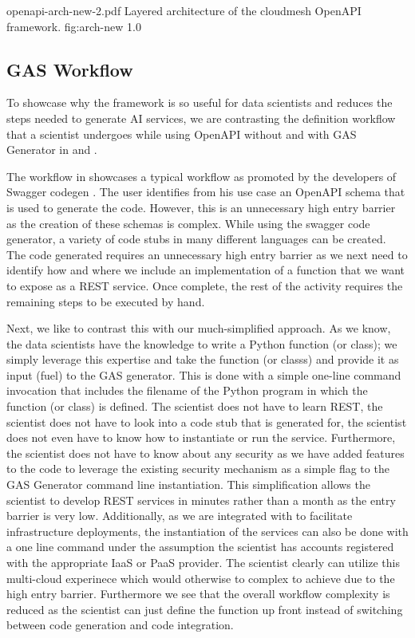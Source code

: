 
\OneFIGURE
    {openapi-arch-new-2.pdf}
    {Layered architecture of the cloudmesh OpenAPI framework.}
    {fig:arch-new}
    {1.0}

\subsection{GAS Workflow}

To showcase why the framework is so useful for data scientists and reduces
the steps needed to generate AI services, we are
contrasting the definition workflow that a scientist undergoes while
using OpenAPI without and with GAS Generator
in  and .

The workflow in  showcases a typical workflow
as promoted by the developers of Swagger
codegen \cite{www-swagger-codegen}. The user identifies from his use
case an OpenAPI schema that is used to generate the code. However,
this is an unnecessary high entry barrier as the creation of these
schemas is complex. While using the swagger code generator, a variety
of code stubs in many different languages can be created. The code
generated requires an unnecessary high entry barrier as we next need
to identify how and where we include an implementation of a function
that we want to expose as a REST service. Once complete, the rest of
the activity requires the remaining steps to be executed by hand.

Next, we like to contrast this with our much-simplified approach. As
we know, the data scientists have the knowledge to write a Python
function (or class); we simply leverage this expertise and take the
function (or classs) and provide it as input (fuel) to the GAS
generator. This is done with a simple one-line command invocation that
includes the filename of the Python program in which the function (or
class) is defined. The scientist does not have to learn REST, the
scientist does not have to look into a code stub that is generated for,
the scientist does not even have to know how to instantiate or run
the service. Furthermore, the scientist does not have to know about
any security as we have added features to the code to leverage the
existing security mechanism as a simple flag to the GAS Generator
command line instantiation. This simplification allows the scientist
to develop REST services in minutes rather than a month as the entry
barrier is very low. Additionally, as we are integrated with \Cloudmesh
to facilitate
infrastructure deployments, the instantiation of the services can also
be done with a one line command under the assumption the scientist has
accounts registered with the appropriate IaaS or PaaS provider. The scientist
clearly can utilize this multi-cloud experinece which would otherwise
to complex to achieve due to the high entry barrier. Furthermore we see that
the overall workflow complexity is reduced as the scientist can just define the
function up front instead of switching between code generation and code
integration.

